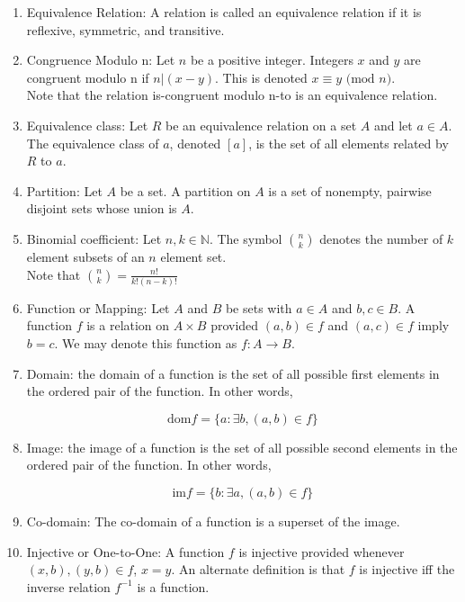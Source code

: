 \documentclass{article}
\begin{document}
\begin{enumerate}
    \item Equivalence Relation: A relation is called an equivalence relation if it is reflexive, symmetric, and transitive.

    \item Congruence Modulo n: Let $n$ be a positive integer.
    Integers $x$ and $y$ are congruent modulo n if $n|(x-y)$.
    This is denoted $x \equiv y$ $(\text{mod}$ $n)$.\\

    Note that the relation is-congruent modulo n-to is an equivalence relation.

    \item Equivalence class: Let $R$ be an equivalence relation on a set $A$ and let $a\in A$.
    The equivalence class of $a$, denoted $[a]$, is the set of all elements related by $R$ to $a$.

    \item Partition: Let $A$ be a set.
    A partition on $A$ is a set of nonempty, pairwise disjoint sets whose union is $A$.

    \item Binomial coefficient: Let $n,k\in\mathbb{N}$.
    The symbol ${n\choose k}$ denotes the number of $k$ element subsets of an $n$ element set.\\

    Note that ${n\choose k}=\frac{n!}{k!(n-k)!}$

    \item Function or Mapping: Let $A$ and $B$ be sets with $a\in A$ and $b,c\in B$.
    A function $f$ is a relation on $A\times B$ provided $(a,b)\in f$ and $(a,c)\in f$ imply $b=c$.
    We may denote this function as $f: A\to B$.

    \item Domain: the domain of a function is the set of all possible first elements in the ordered pair of the function.
    In other words,

    \[\text{dom} f= \{a: \exists b, (a,b)\in f\}\]

    \item Image: the image of a function is the set of all possible second elements in the ordered pair of the function.
    In other words,

    \[\text{im} f= \{b: \exists a, (a,b)\in f\}\]

    \item Co-domain: The co-domain of a function is a superset of the image.

    \item Injective or One-to-One: A function $f$ is injective provided whenever $(x,b),(y,b)\in f$, $x=y$.
    An alternate definition is that $f$ is injective iff the inverse relation $f^{-1}$ is a function.


\end{enumerate}
\end{document}
